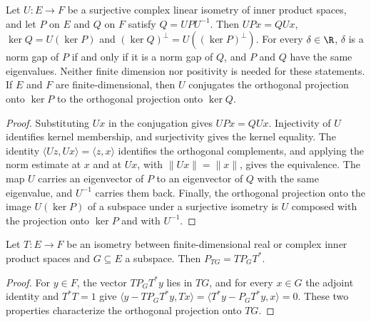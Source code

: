 \begin{lemma}
    \label{lem:gap_isometric_conjugation}
    \leanok
    Let $U:E\to F$ be a surjective complex linear isometry of inner product spaces,
    and let $P$ on $E$ and $Q$ on $F$ satisfy $Q=UPU^{-1}$. Then $UPx=QUx$,
    $\ker Q=U(\ker P)$ and $(\ker Q)^\perp=U((\ker P)^\perp)$. For every $\delta\in\R$,
    $\delta$ is a norm gap of $P$ if and only if it is a norm gap of $Q$, and $P$ and $Q$
    have the same eigenvalues. Neither finite dimension nor positivity is needed for
    these statements. If $E$ and $F$ are finite-dimensional, then $U$ conjugates the
    orthogonal projection onto $\ker P$ to the orthogonal projection onto $\ker Q$.
\end{lemma}
\begin{proof}\leanok
    Substituting $Ux$ in the conjugation gives $UPx=QUx$. Injectivity of $U$
    identifies kernel membership, and surjectivity gives the kernel equality. The
    identity $\langle Uz,Ux\rangle=\langle z,x\rangle$ identifies the orthogonal
    complements, and applying the norm estimate at $x$ and at $Ux$, with
    $\lVert Ux\rVert=\lVert x\rVert$, gives the equivalence. The map $U$ carries an
    eigenvector of $P$ to an eigenvector of $Q$ with the same eigenvalue, and $U^{-1}$
    carries them back. Finally, the orthogonal projection onto the image $U(\ker P)$ of a
    subspace under a surjective isometry is $U$ composed with the projection onto
    $\ker P$ and with $U^{-1}$.
\end{proof}

\begin{lemma}
    \label{lem:gap_isometric_image_projection}
    \leanok
    Let $T:E\to F$ be an isometry between finite-dimensional real or complex inner
    product spaces and $G\subseteq E$ a subspace. Then $P_{TG}=TP_GT^*$.
\end{lemma}
\begin{proof}\leanok
    For $y\in F$, the vector $TP_GT^*y$ lies in $TG$, and for every $x\in G$ the
    adjoint identity and $T^*T=1$ give
    $\langle y-TP_GT^*y,Tx\rangle=\langle T^*y-P_GT^*y,x\rangle=0$. These two
    properties characterize the orthogonal projection onto $TG$.
\end{proof}

